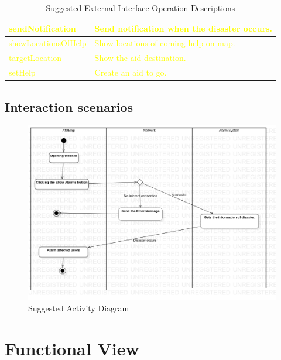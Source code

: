 \begin{center}
\begin{table}[H]
\begin{tabular}{| m{6cm}| m{8cm} |}
            \hline
            \textcolor{yellow}{sendNotification} & \textcolor{yellow}{Send notification when the disaster occurs.} \\
            \hline
            \textcolor{yellow}{showLocationsOfHelp} & \textcolor{yellow}{Show locations of coming help on map.} \\
            \hline
            \textcolor{yellow}{targetLocation} & \textcolor{yellow}{Show the aid destination.} \\
            \hline
            \textcolor{yellow}{setHelp} & \textcolor{yellow}{Create an aid to go.} \\
            \hline
        \end{tabular}
        \caption[Suggested External Interface Operation Descriptions]{Suggested External Interface Operation Descriptions}
    \end{table}
\end{center}

\subsection{Interaction scenarios}

\begin{figure}[H]
    \includegraphics[scale = 0.5]{assets/Activity Diagram Suggestion.png}
    \caption[Suggested Activity Diagram]{Suggested Activity Diagram}
\end{figure}

\section{Functional View}

